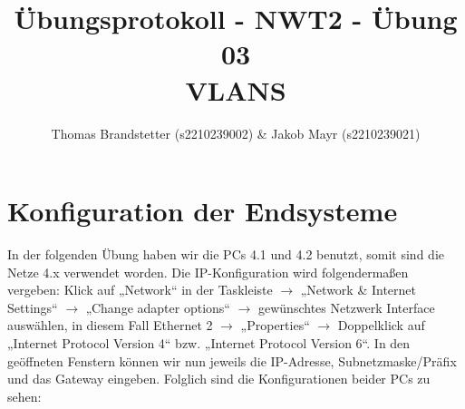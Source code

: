 \documentclass{article}
\title{Übungsprotokoll - NWT2 - Übung 03 \\ VLANS}
\author{\vspace{0.5cm} Thomas Brandstetter (s2210239002) \& Jakob Mayr (s2210239021)}
\begin{document}
\maketitle

\section{Konfiguration der Endsysteme}

In der folgenden Übung haben wir die PCs 4.1 und 4.2 benutzt, somit sind die Netze 4.x verwendet worden. Die IP-Konfiguration wird folgendermaßen vergeben: Klick auf „Network“ in der Taskleiste $\rightarrow$ „Network \& Internet Settings“ $\rightarrow$ „Change adapter options“ $\rightarrow$ gewünschtes Netzwerk Interface auswählen, in diesem Fall Ethernet 2 $\rightarrow$ „Properties“ $\rightarrow$ Doppelklick auf „Internet Protocol Version 4“ bzw. „Internet Protocol Version 6“. In den geöffneten Fenstern können wir nun jeweils die IP-Adresse, Subnetzmaske/Präfix und das Gateway eingeben. Folglich sind die Konfigurationen beider PCs zu sehen:
\end{document}
